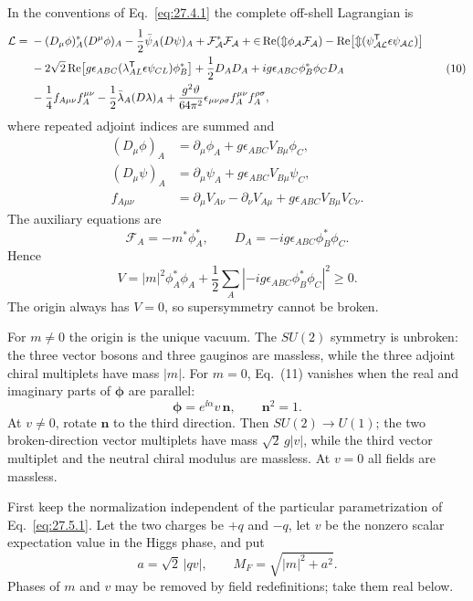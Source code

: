 \begin{enumerate}
  In the conventions of Eq.~\eqref{eq:27.4.1} the complete off-shell
  Lagrangian is
  \[
  \begin{aligned}
    \mathcal L={}&
      -(D_\mu\phi)_A^*(D^\mu\phi)_A
      -\frac12\bar\psi_A(\sl D\psi)_A
      +\mathcal F_A^*\mathcal F_A
      +2\operatorname{Re}(m\phi_A\mathcal F_A)
      -\operatorname{Re}\!\left[
        m(\psi_{AL}^{\mathsf T}\epsilon\psi_{AL})\right]\\
    &-2\sqrt2\operatorname{Re}\!\left[
       g\epsilon_{ABC}
       (\lambda_{AL}^{\mathsf T}\epsilon\psi_{CL})\phi_B^*\right]
      +\frac12D_AD_A
      +ig\epsilon_{ABC}\phi_B^*\phi_CD_A\\
    &-\frac14f_{A\mu\nu}f_A^{\mu\nu}
      -\frac12\bar\lambda_A(\sl D\lambda)_A
      +\frac{g^2\vartheta}{64\pi^2}
        \epsilon_{\mu\nu\rho\sigma}f_A^{\mu\nu}f_A^{\rho\sigma},
  \end{aligned}
    \tag{10}
  \]
  where repeated adjoint indices are summed and
  \[
  \begin{aligned}
    (D_\mu\phi)_A&=\partial_\mu\phi_A
       +g\epsilon_{ABC}V_{B\mu}\phi_C,\\
    (D_\mu\psi)_A&=\partial_\mu\psi_A
       +g\epsilon_{ABC}V_{B\mu}\psi_C,\\
    f_{A\mu\nu}&=\partial_\mu V_{A\nu}-\partial_\nu V_{A\mu}
       +g\epsilon_{ABC}V_{B\mu}V_{C\nu}.
  \end{aligned}
  \]
  The auxiliary equations are
  \[
    \mathcal F_A=-m^*\phi_A^*,\qquad
    D_A=-ig\epsilon_{ABC}\phi_B^*\phi_C .
    \tag{11}
  \]
  Hence
  \[
    V=|m|^2\phi_A^*\phi_A
      +\frac12\sum_A
       \left|-ig\epsilon_{ABC}\phi_B^*\phi_C\right|^2\geq0.
    \tag{12}
  \]
  The origin always has \(V=0\), so supersymmetry cannot be broken.

  For \(m\ne0\) the origin is the unique vacuum.  The \(SU(2)\) symmetry is
  unbroken: the three vector bosons and three gauginos are massless, while
  the three adjoint chiral multiplets have mass \(|m|\).  For \(m=0\),
  Eq.~(11) vanishes when the real and imaginary parts of \(\boldsymbol\phi\)
  are parallel:
  \[
    \boldsymbol\phi=e^{\ii\alpha}v\,\boldsymbol n,\qquad
    \boldsymbol n^2=1 .
    \tag{13}
  \]
  At \(v\ne0\), rotate \(\boldsymbol n\) to the third direction.
  Then \(SU(2)\to U(1)\); the two broken-direction vector multiplets have
  mass \(\sqrt2\,g|v|\), while the third vector multiplet and the neutral
  chiral modulus are massless.  At \(v=0\) all fields are massless.

  First keep the normalization independent of the particular parametrization
  of Eq.~\eqref{eq:27.5.1}.  Let the two charges be \(+q\) and \(-q\), let
  \(v\) be the nonzero scalar expectation value in the Higgs phase, and put
  \[
    a=\sqrt2\,|qv|,\qquad M_F=\sqrt{|m|^2+a^2}.
    \tag{14}
  \]
  Phases of \(m\) and \(v\) may be removed by field redefinitions; take
  them real below.


\end{enumerate}
